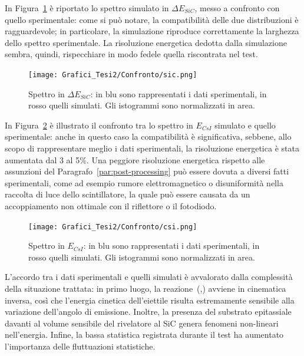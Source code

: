 In Figura~\ref{fig:spettro_sic_confronto} è riportato lo spettro simulato in $\Delta E_{SiC}$, messo a confronto con quello sperimentale: come si può notare, la compatibilità delle due distribuzioni è ragguardevole; in particolare, la simulazione riproduce correttamente la larghezza dello spettro sperimentale.
La risoluzione energetica dedotta dalla simulazione sembra, quindi, rispecchiare in modo fedele quella riscontrata nel test.
\begin{figure} [!p]
	\centering
	\texttt{[image: Grafici\_Tesi2/Confronto/sic.png]}
	\caption{Spettro in $\Delta E_{SiC}$: in blu sono rappresentati i dati sperimentali, in rosso quelli simulati. Gli istogrammi sono normalizzati in area.} \label{fig:spettro_sic_confronto}
\end{figure}

In Figura~\ref{fig:spettro_csi_confronto} è illustrato il confronto tra lo spettro in $E_{CsI}$ simulato e quello sperimentale: anche in questo caso la compatibilità è significativa, sebbene, allo scopo di rappresentare meglio i dati sperimentali, la risoluzione energetica è stata aumentata dal 3 al 5\%.
Una peggiore risoluzione energetica rispetto alle assunzioni del Paragrafo~\ref{par:post-processing} può essere dovuta a diversi fatti sperimentali, come ad esempio rumore elettromagnetico o disuniformità nella raccolta di luce dello scintillatore, la quale può essere causata da un accoppiamento non ottimale con il riflettore o il fotodiodo.


\begin{figure} [!p]
	\centering
	\texttt{[image: Grafici\_Tesi2/Confronto/csi.png]}
	\caption{Spettro in $E_{CsI}$: in blu sono rappresentati i dati sperimentali, in rosso quelli simulati. Gli istogrammi sono normalizzati in area.} \label{fig:spettro_csi_confronto}
\end{figure}

L'accordo tra i dati sperimentali e quelli simulati è avvalorato dalla complessità della situazione trattata: in primo luogo, la reazione~(,) avviene in cinematica inversa, così che l'energia cinetica dell'eiettile risulta estremamente sensibile alla variazione dell'angolo di emissione. 
Inoltre, la presenza del substrato epitassiale davanti al volume sensibile del rivelatore al SiC genera fenomeni non-lineari nell'energia.
Infine, la bassa statistica registrata durante il test ha aumentato l'importanza delle fluttuazioni statistiche.

